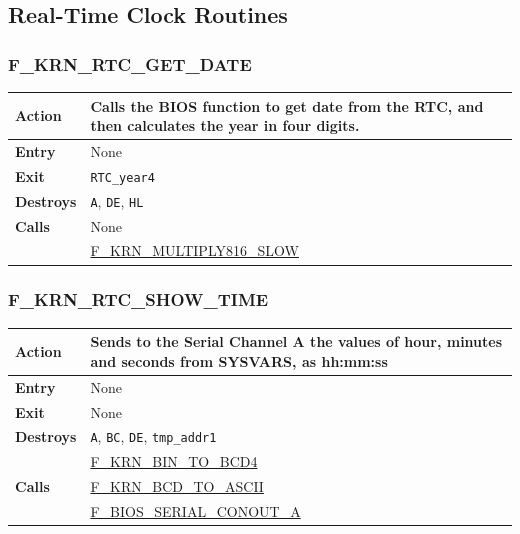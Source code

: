 \documentclass[a4paper,11pt]{article}
\begin{document}
    \subsection{Real-Time Clock Routines}

        \subsubsection{F\_KRN\_RTC\_GET\_DATE}
        \label{func:fkrnrtcgetdate}
        \begin{tabular}{l p{9cm}}
            \hline\textbf{Action}
            & Calls the BIOS function to get date from the RTC, and then
            calculates the year in four digits. \\
            \hline\textbf{Entry} & None \\
            \hline\textbf{Exit} & \texttt{RTC\_year4}\\
            \hline\textbf{Destroys} & \texttt{A}, \texttt{DE}, \texttt{HL} \\
            \hline\textbf{Calls} & None \\
            & \hyperref[func:fkrnmultiply816slow]{F\_KRN\_MULTIPLY816\_SLOW}\\
            \hline
        \end{tabular}

        \subsubsection{F\_KRN\_RTC\_SHOW\_TIME}
        \label{func:fkrnrtcshowtime}
        \begin{tabular}{l p{9cm}}
            \hline\textbf{Action}
            & Sends to the \textbf{Serial Channel} A the values of hour, minutes
            and seconds from SYSVARS, as hh:mm:ss\\
            \hline\textbf{Entry} & None \\
            \hline\textbf{Exit} & None \\
            \hline\textbf{Destroys} & \texttt{A}, \texttt{BC}, \texttt{DE},
            \texttt{tmp\_addr1}\\
            \hline\multirow[t]{3}{4em}{\textbf{Calls}}
            & \hyperref[func:fkrnbintobcd4]{F\_KRN\_BIN\_TO\_BCD4}\\
            & \hyperref[func:fkrnbcdtoascii]{F\_KRN\_BCD\_TO\_ASCII}\\
            & \hyperref[func:fbiosserialconouta]{F\_BIOS\_SERIAL\_CONOUT\_A}\\
            \hline
        \end{tabular}
\end{document}
